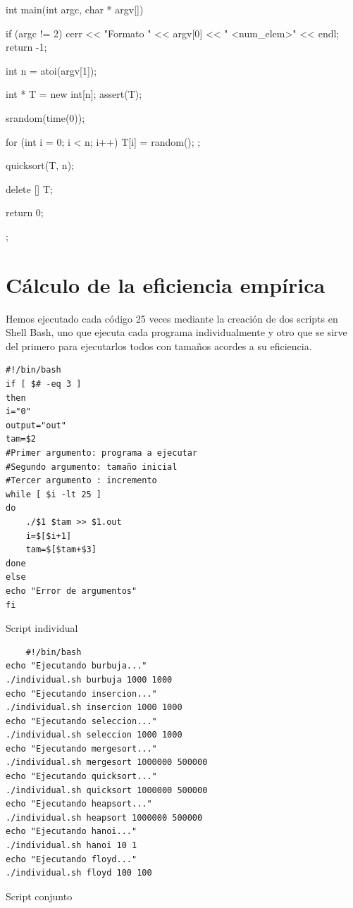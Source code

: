 \documentclass[12pt,spanish]{article}
\begin{document}
\begin{multicols}{2}
\begin{tcblisting}
int main(int argc, char * argv[])
{
    if (argc != 2)
    {
      cerr << "Formato " << argv[0] << " <num_elem>" << endl;
      return -1;
    }

  int n = atoi(argv[1]);

  int * T = new int[n];
  assert(T);

  srandom(time(0));

  for (int i = 0; i < n; i++)
    {
      T[i] = random();
    };

  quicksort(T, n);

  delete [] T;

  return 0;
};
\end{tcblisting}
\end{multicols}

\section{Cálculo de la eficiencia empírica}
Hemos ejecutado cada código 25 veces mediante la creación de dos scripts en Shell Bash, uno que ejecuta cada programa individualmente y otro que se sirve del primero para ejecutarlos todos con tamaños acordes a su eficiencia.
\begin{listing}[H]
\begin{verbatim}
#!/bin/bash
if [ $# -eq 3 ]
then
i="0"
output="out"
tam=$2
#Primer argumento: programa a ejecutar
#Segundo argumento: tamaño inicial
#Tercer argumento : incremento
while [ $i -lt 25 ]
do
	./$1 $tam >> $1.out
	i=$[$i+1]
	tam=$[$tam+$3]
done
else
echo "Error de argumentos"
fi
\end{verbatim}
\caption{Script individual}
\end{listing}
\newpage

\begin{listing}[H]
\begin{verbatim}
	#!/bin/bash
echo "Ejecutando burbuja..."
./individual.sh burbuja 1000 1000
echo "Ejecutando insercion..."
./individual.sh insercion 1000 1000
echo "Ejecutando seleccion..."
./individual.sh seleccion 1000 1000
echo "Ejecutando mergesort..."
./individual.sh mergesort 1000000 500000
echo "Ejecutando quicksort..."
./individual.sh quicksort 1000000 500000
echo "Ejecutando heapsort..."
./individual.sh heapsort 1000000 500000
echo "Ejecutando hanoi..."
./individual.sh hanoi 10 1
echo "Ejecutando floyd..."
./individual.sh floyd 100 100
\end{verbatim}
\caption{Script conjunto}
\end{listing}
\end{document}
